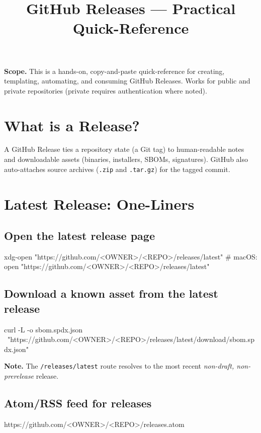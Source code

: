 \documentclass[11pt]{article}
\title{\vspace{-1em}\textbf{GitHub Releases — Practical Quick-Reference}\vspace{-0.5em}}
\author{}
\date{}
\newcommand{\file}[1]{\texttt{#1}}
\newcommand{\ghendpoint}[1]{\texttt{#1}} %
\begin{document}
\maketitle
\vspace{-2em}

\begin{tcolorbox}
\textbf{Scope.} This is a hands-on, copy-and-paste quick-reference for creating, templating, automating, and consuming GitHub Releases. Works for public and private repositories (private requires authentication where noted).
\end{tcolorbox}

\section{What is a Release?}
A GitHub Release ties a repository state (a Git tag) to human-readable notes and downloadable assets (binaries, installers, SBOMs, signatures). GitHub also auto-attaches source archives (\file{.zip} and \file{.tar.gz}) for the tagged commit.

\section{Latest Release: One-Liners}
\subsection*{Open the latest release page}
\begin{bashcode}
xdg-open "https://github.com/<OWNER>/<REPO>/releases/latest"
# macOS: open "https://github.com/<OWNER>/<REPO>/releases/latest"
\end{bashcode}

\subsection*{Download a known asset from the latest release}
\begin{bashcode}
curl -L -o sbom.spdx.json \
  "https://github.com/<OWNER>/<REPO>/releases/latest/download/sbom.spdx.json"
\end{bashcode}

\begin{tcolorbox}
\textbf{Note.} The \ghendpoint{/releases/latest} route resolves to the most recent \emph{non-draft, non-prerelease} release.
\end{tcolorbox}

\subsection*{Atom/RSS feed for releases}
\begin{textcode}
https://github.com/<OWNER>/<REPO>/releases.atom
\end{textcode}
\clearpage
\end{document}
